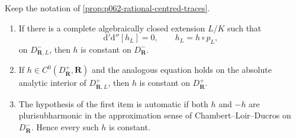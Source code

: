 \begin{proposition}\label{prop:p062-explicit-base-change}
Keep the notation of \cref{prop:p062-rational-centred-traces}.

\begin{enumerate}
\item If there is a complete algebraically closed extension \(L/K\) such
that
\[
             \mathrm d'\mathrm d''[h_L]=0,
             \qquad h_L=h\circ p_L,
\]
on \(D^-_{\mathbf R,L}\), then \(h\) is constant on
\(D^-_{\mathbf R}\).

\item If \(h\in C^0(D^+_{\mathbf R},\mathbf R)\) and the analogous
equation holds on the absolute analytic interior of
\(D^+_{\mathbf R,L}\), then \(h\) is constant on
\(D^+_{\mathbf R}\).

\item The hypothesis of the first item is automatic if both \(h\) and
\(-h\) are plurisubharmonic in the approximation sense of
Chambert--Loir--Ducros on \(D^-_{\mathbf R}\).  Hence every such \(h\) is
constant.
\end{enumerate}
\end{proposition}
